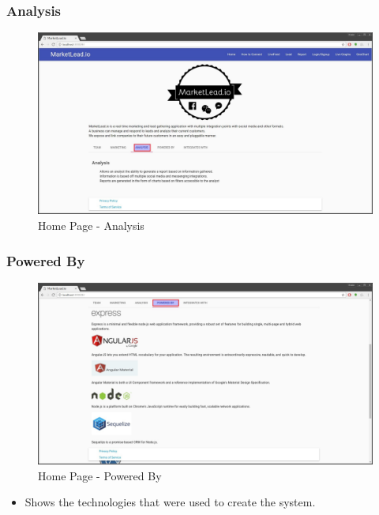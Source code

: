\documentclass{article}
\begin{document}
			\subsubsection{Analysis}
				\begin{figure}[H]
					\includegraphics[width=\textwidth]{images/home_analysis.jpg}
					\caption{Home Page - Analysis}
					\label{fig:homeAnalysis}
				\end{figure}

			\subsubsection{Powered By}
				\begin{figure}[H]
					\includegraphics[width=\textwidth]{images/home_powered_by.jpg}
					\caption{Home Page - Powered By}
					\label{fig:homePoweredBy}
				\end{figure}

				\begin{itemize}
					\item Shows the technologies that were used to create the system.
				\end{itemize}
\end{document}
